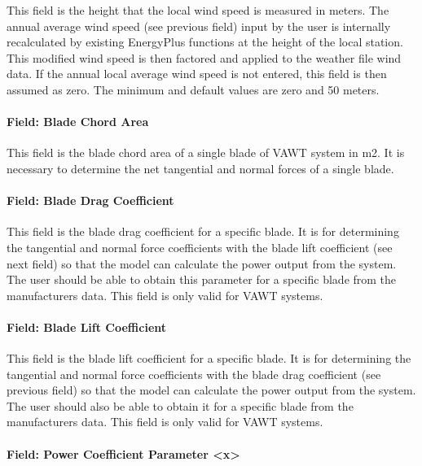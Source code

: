 This field is the height that the local wind speed is measured in meters. The annual average wind speed (see previous field) input by the user is internally recalculated by existing EnergyPlus functions at the height of the local station. This modified wind speed is then factored and applied to the weather file wind data. If the annual local average wind speed is not entered, this field is then assumed as zero. The minimum and default values are zero and 50 meters.

\paragraph{Field: Blade Chord Area}\label{field-blade-chord-area}

This field is the blade chord area of a single blade of VAWT system in m2. It is necessary to determine the net tangential and normal forces of a single blade.

\paragraph{Field: Blade Drag Coefficient}\label{field-blade-drag-coefficient}

This field is the blade drag coefficient for a specific blade. It is for determining the tangential and normal force coefficients with the blade lift coefficient (see next field) so that the model can calculate the power output from the system. The user should be able to obtain this parameter for a specific blade from the manufacturers data. This field is only valid for VAWT systems.

\paragraph{Field: Blade Lift Coefficient}\label{field-blade-lift-coefficient}

This field is the blade lift coefficient for a specific blade. It is for determining the tangential and normal force coefficients with the blade drag coefficient (see previous field) so that the model can calculate the power output from the system. The user should also be able to obtain it for a specific blade from the manufacturers data. This field is only valid for VAWT systems.

\paragraph{Field: Power Coefficient Parameter \textless{}x\textgreater{}}\label{field-power-coefficient-parameter-x}

